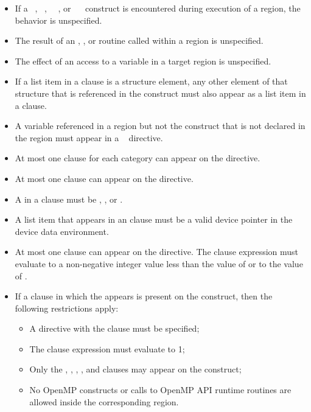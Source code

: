 \restrictions
\begin{itemize}
\item If a ~, ~, 
      ~~, or 
      ~~ construct is encountered during
      execution of a  region, the behavior is unspecified.
\item The result of an , , 
      or  routine called within a  region 
      is unspecified.
\item The effect of an access to a  variable in a target region 
      is unspecified.
\item If a list item in a  clause is a structure element, any other
      element of that structure that is referenced in the  construct
      must also appear as a list item in a  clause.
\item A variable referenced in a  region but not the  
      construct that is not declared in the  region must appear in 
      a ~ directive.
\item At most one  clause for each category can appear on the 
      directive.
\item At most one  clause can appear on the directive.
\item A  in a  clause must be , , 
       or .
\item A list item that appears in an  clause must be a valid 
      device pointer in the device data environment.
\item At most one  clause can appear on the directive. The  
      clause expression must evaluate to a non-negative integer value less than the 
      value of  or to the value of 
      .
\item If a  clause in which the   
      appears is present on the construct, then the following restrictions apply:

\begin{itemize}
\item A  directive with the  clause must 
      be specified;
\item The  clause expression must evaluate to 1;
\item Only the , , ,
      , and  clauses may appear on the construct;
\item No OpenMP constructs or calls to OpenMP API runtime routines are allowed
      inside the corresponding  region.
\end{itemize}


\end{itemize}
